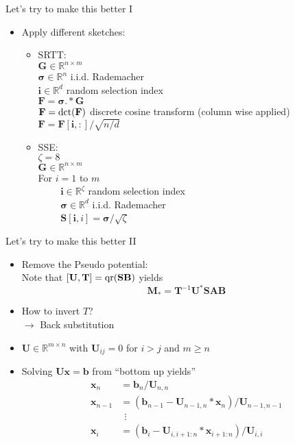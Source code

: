 \documentclass{beamer}
\newcommand{\bgk}[1]{\boldsymbol{#1}}
\newcommand{\bsigma}{\bgk{\sigma}}
\newcommand{\bvec}[1]{\mathbf{#1}}
\newcommand{\vb}{\bvec{b}}
\newcommand{\vi}{\bvec{i}}
\newcommand{\vx}{\bvec{x}}
\newcommand{\vA}{\bvec{A}}
\newcommand{\vB}{\bvec{B}}
\newcommand{\vF}{\bvec{F}}
\newcommand{\vG}{\bvec{G}}
\newcommand{\vM}{\bvec{M}}
\newcommand{\vS}{\bvec{S}}
\newcommand{\vT}{\bvec{T}}
\newcommand{\vU}{\bvec{U}}
\newcommand{\bitem}{\item[$\bullet$]}
\begin{document}
\begin{frame}{Let's try to make this better I}

\begin{itemize}
    \bitem Apply different sketches:
    \begin{itemize}
        \item[i)]  SRTT:\\
        $\vG \in\mathbb{R}^{n\times m}$\\
        $\bsigma \in \mathbb{R}^n$ i.i.d. Rademacher\\
        $\vi \in \mathbb{R}^d$ random selection index\\
        $\vF = \bsigma.* \vG$\\
        $\vF = {\rm dct}(\vF)$ discrete cosine transform (column wise applied)\\
        $\vF = \vF[\vi,:]/\sqrt{n/d}$
        \item[ii)] SSE:\\
        $\zeta = 8$\\
        $\vG \in\mathbb{R}^{n\times m}$\\
        For $i=1$ to $m$\\
        $\qquad$ $\vi \in \mathbb{R}^\zeta$ random selection index\\
        $\qquad$ $\bsigma \in \mathbb{R}^d$ i.i.d. Rademacher\\
        $\qquad$ $\vS[\vi, i] = \bsigma/\sqrt{\zeta}$
    \end{itemize}
    
\end{itemize}
\end{frame}

\begin{frame}{Let's try to make this better II}

\begin{itemize}
    \bitem Remove the Pseudo potential:\\
    Note that $[\vU, \vT] ={\rm qr}(\vS\vB)$ yields
    $$
    \vM_*
    =
    \vT^{-1}\vU^* \vS\vA\vB
    $$
    \bitem How to invert $T$?\\
    $\rightarrow$ Back substitution\\
    
    \bitem $\vU \in \mathbb{R}^{m \times n}$ with $\vU_{ij} = 0$ for $i>j$ and $m\geq n$
    \bitem Solving $\vU \vx = \vb$ from ``bottom up yields''
    $$
    \begin{aligned}
    \vx_{n} &= \vb_{n}/ \vU_{n,n}\\
    \vx_{n-1} &= (\vb_{n-1} - \vU_{n-1,n} * \vx_{n})/\vU_{n-1,n-1} \\
    &~~\vdots\\
    \vx_{i} &= (\vb_{i} - \vU_{i,i+1:n} * \vx_{i+1:n})/\vU_{i,i} 
    \end{aligned}
    $$
\end{itemize}

\end{frame}
\end{document}
